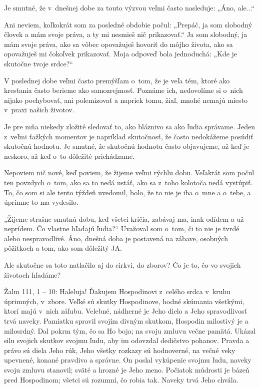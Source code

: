 


Je smutné, že v~dnešnej dobe za touto výzvou veľmi často nasleduje: „Áno, ale...“

Ani neviem, koľkokrát som za posledné obdobie počul: „Prepáč, ja som slobodný človek a mám svoje práva, a ty mi nesmieš nič prikazovať.“ Ja som slobodný, ja mám svoje práva, ako sa vôbec opovažuješ hovoriť do môjho života, ako sa opovažuješ mi čokoľvek prikazovať. Moja odpoveď bola jednoduchá: „Kde je skutočne tvoje srdce?“

V poslednej dobe veľmi často premýšľam o~tom, že je veľa tém, ktoré ako kresťania často berieme ako samozrejmosť. Poznáme ich, nedovolíme si o~nich nijako pochybovať, ani polemizovať a napriek tomu, žiaľ, mnohé nemajú miesto v~praxi našich životov.

Je pre mňa niekedy zložité sledovať to, ako bláznivo sa ako ľudia správame. Jeden z~veľmi ťažkých momentov je napríklad skutočnosť, že  často nedokážeme posúdiť skutočnú hodnotu. Je smutné, že skutočnú hodnotu často objavujeme, až keď je neskoro, až keď o~to dôležité prichádzame.

Nepoviem nič nové, keď poviem, že žijeme veľmi rýchlu dobu. Veľakrát som počul ten povzdych o~tom, ako sa to nedá ustáť, ako sa z~toho kolotoča nedá vystúpiť. To, čo som si ale tento týždeň uvedomil, bolo, že to nie je iba o~mne a o~tebe, a úprimne to ma vydesilo.

„Žijeme strašne smutnú dobu, keď všetci kričia, zabávaj ma, inak odídem a už neprídem. Čo vlastne hľadajú ľudia?“ Uvažoval som o~tom,  či to nie je tvrdé alebo nespravodlivé. Áno, dnešná doba je postavená na zábave, osobných pôžitkoch a tom, ako som dôležitý JA.

Ale skutočne sa toto natlačilo aj do cirkvi, do zborov? Čo je to, čo vo svojich životoch hľadáme?

Žalm 111, 1 -- 10: Haleluja! Ďakujem Hospodinovi z~celého srdca v~kruhu úprimných, v~zbore. Veľké sú skutky Hospodinove, hodné skúmania všetkými, ktorí majú v~nich záľubu. Velebné, nádherné je Jeho dielo a Jeho spravodlivosť trvá naveky. Pamiatku spravil svojím divným skutkom, Hospodin milostivý je a milosrdný. Dal pokrm tým, čo sa Ho boja; na svoju zmluvu večne pamätá. Ukázal silu svojich skutkov svojmu ľudu, aby im odovzdal dedičstvo pohanov. Pravda a právo sú diela Jeho rúk, Jeho všetky rozkazy sú hodnoverné, na večné veky upevnené, konané pravdivo a správne. On poslal vykúpenie svojmu ľudu, naveky svoju zmluvu stanovil; sväté a hrozné je Jeho meno. Počiatok múdrosti je bázeň pred Hospodinom; všetci sú rozumní, čo robia tak. Naveky trvá Jeho chvála.

